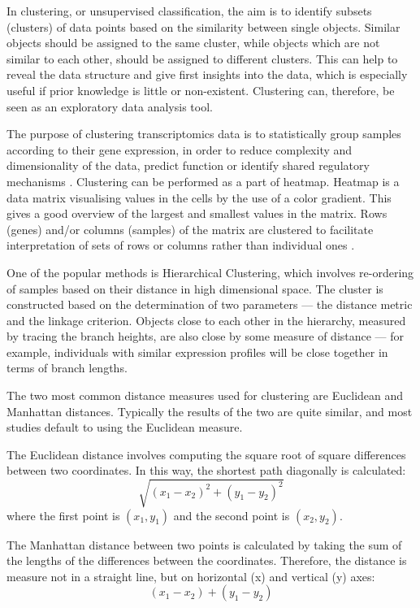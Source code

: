     In clustering, or unsupervised classification, the aim is to identify subsets (clusters) of data points based on the similarity between single objects. Similar objects should be assigned to the same cluster, while objects which are not similar to each other, should be assigned to different clusters. This can help to reveal the data structure and give first insights into the data, which is especially useful if prior knowledge is little or non-existent. Clustering can, therefore, be seen as an exploratory data analysis tool. 
        
    The purpose of clustering transcriptomics data is to statistically group samples according to their gene expression, in order to reduce complexity and dimensionality of the data, predict function or identify shared regulatory mechanisms \cite{Metsalu2015ClustVis:Heatmap}. Clustering can be performed as a part of heatmap. Heatmap is a data matrix visualising values in the cells by the use of a color gradient. This gives a good overview of the largest and smallest values in the matrix. Rows (genes) and/or columns (samples) of the matrix are clustered to facilitate interpretation of sets of rows or columns rather than individual ones \cite{Metsalu2015ClustVis:Heatmap}.
    
    
    One of the popular methods is Hierarchical Clustering, which involves re-ordering of samples based on their distance in high dimensional space. The cluster is constructed based on the determination of two parameters — the distance metric and the linkage criterion. Objects close to each other in the hierarchy, measured by tracing the branch heights, are also close by some measure of distance — for example, individuals with similar expression profiles will be close together in terms of branch lengths.
    
    \newpage
    The two most common distance measures used for clustering are Euclidean and Manhattan distances. Typically the results of the two are quite similar, and most studies default to using the Euclidean measure. 
    
    The Euclidean distance involves computing the square root of square differences between two coordinates. In this way, the shortest path diagonally is calculated: $$ \sqrt{(x_{1}-x_{2})^{2}+(y_{1}-y_{2})^{2}}$$ where the first point is $(x_1, y_1)$ and the second point is $(x_2, y_2).$
    
    The Manhattan distance between two points is calculated by taking the sum of the lengths of the differences between the coordinates. Therefore, the distance is measure not in a straight line, but on horizontal (x) and vertical (y) axes: $$ (x_{1}-x_{2})+(y_{1}-y_{2})$$
    

